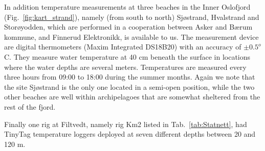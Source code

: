 
In addition temperature measurements at three beaches in the Inner Oslofjord (Fig.~\ref{fig:kart_strand}), namely (from south to north) Sj{\o}strand, Hvalstrand and Stor{\o}yodden, which are performed in a cooperation between Asker and B{\ae}rum kommune, and Finnerud Elektronikk, is available to us. The measurement device are digital thermometers (Maxim Integrated DS18B20) with an accuracy of $\pm 0.5^o$C. They measure water temperature at 40 cm beneath the surface in locations where the water depths are several meters. Temperatures are measured every three hours from 09:00 to 18:00 during the summer months. Again we note that the site Sj{\o}strand is the only one located in a semi-open position, while the two other beaches are well within archipelagoes that are somewhat sheltered from the rest of the fjord.

Finally one rig at Filtvedt, namely rig Km2 listed in Tab.~\ref{tab:Statnett}, had TinyTag temperature loggers deployed at seven different depths between 20 and 120 m.

